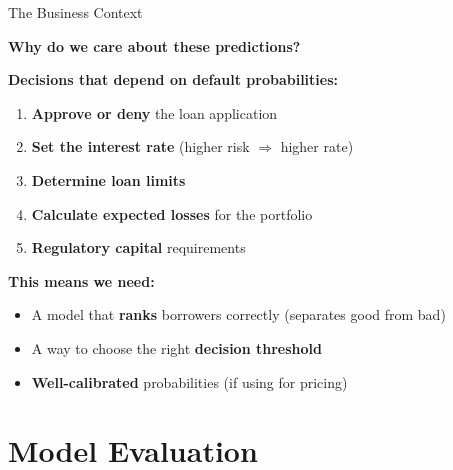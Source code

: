 \documentclass[10pt]{beamer}
\newcommand{\highlight}[1]{\textcolor{AccentOrange}{\textbf{#1}}}
\begin{document}
\begin{frame}{The Business Context}

  \textbf{Why do we care about these predictions?}

  \vspace{1em}
  \textbf{Decisions that depend on default probabilities:}
  \begin{enumerate}
    \item \highlight{Approve or deny} the loan application
    \item \highlight{Set the interest rate} (higher risk $\Rightarrow$ higher rate)
    \item \highlight{Determine loan limits}
    \item \highlight{Calculate expected losses} for the portfolio
    \item \highlight{Regulatory capital} requirements
  \end{enumerate}

  \vspace{1em}
  \textbf{This means we need:}
  \begin{itemize}
    \item A model that \highlight{ranks} borrowers correctly (separates good from bad)
    \item A way to choose the right \highlight{decision threshold}
    \item \highlight{Well-calibrated} probabilities (if using for pricing)
  \end{itemize}
\end{frame}

\section{Model Evaluation}
\end{document}
